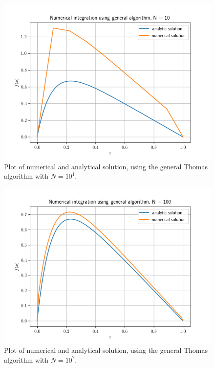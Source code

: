 \documentclass[english,notitlepage,reprint]{revtex4-1}  %
\begin{document}
\begin{figure}[H]
	\centering
	\label{fig:iv:a:1}
	\includegraphics[width=\columnwidth]{plots/Figure_1.png}
	\caption{Plot of numerical and analytical solution, using the general Thomas algorithm with
	\(N=10^{1}\).}
\end{figure}

\begin{figure}[H]
	\centering
	\label{fig:iv:a:2}
	\includegraphics[width=\columnwidth]{plots/Figure_2.png}
	\caption{Plot of numerical and analytical solution, using the general Thomas algorithm with
	\(N=10^{2}\).}
\end{figure}
\end{document}
